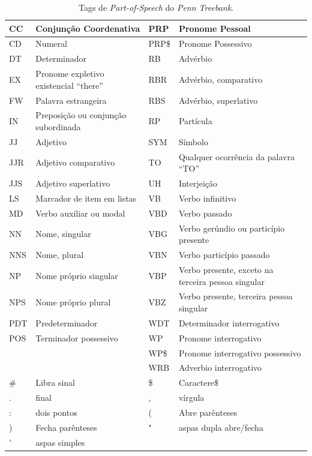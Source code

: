 \begin{table}[H]
   \centering
   \small
   \caption{ Tags de \emph{Part-of-Speech} do \emph{Penn Treebank}.}

   \begin{tabular}{| p{2cm} | p{4cm} | p{2cm} | p{4cm} |}

   \hline

		CC & Conjunção Coordenativa 	& 	PRP & Pronome Pessoal\\
    \hline
		CD & Numeral &   	PRP\$ & Pronome Possessivo\\
      \hline
		DT & Determinador     &		RB & Advérbio\\
      \hline
		EX & Pronome expletivo existencial ``there''     &		RBR & Advérbio, comparativo\\
      \hline
		FW & Palavra estrangeira     &		RBS & Advérbio, superlativo\\
      \hline
		IN & Preposição ou conjunção subordinada      &		RP & Partícula\\
      \hline
		JJ & Adjetivo      &		SYM & Símbolo\\
      \hline
		JJR & Adjetivo comparativo      &		TO & Qualquer ocorrência da palavra ``TO''\\
      \hline
		JJS & Adjetivo superlativo      &		UH & Interjeição\\
      \hline
		LS & Marcador de item em listas      &		VB & Verbo infinitivo\\
      \hline
		MD & Verbo auxiliar ou modal      &		VBD & Verbo passado\\
      \hline
		NN & Nome, singular      &		VBG & Verbo gerúndio ou particípio presente\\
      \hline
		NNS & Nome, plural      &		VBN & Verbo particípio passado\\
      \hline
		NP & Nome próprio singular      &		VBP & Verbo presente, exceto na terceira pessoa singular\\
      \hline
		NPS & Nome próprio plural      &		VBZ & Verbo presente, terceira pessoa singular\\
      \hline
		PDT & Predeterminador      &		WDT & Determinador interrogativo\\
      \hline
		POS & Terminador possessivo      &		WP & Pronome interrogativo\\
    \hline
     & & 	WP\$ & Pronome interrogativo possessivo\\
    \hline
     & & 	WRB & Adverbio interrogativo  \\
    \hline
     \# & Libra sinal & \$ & Caractere\$ \\
    \hline
     . & final & , & vírgula \\
    \hline
     : & dois pontos & ( & Abre parênteses \\
    \hline
     ) & Fecha parênteses & " & aspas dupla abre/fecha \\
     \hline
     ' & aspas simples & &  \\
    \hline

   \end{tabular}
   \label{tbl:penn_treebank_pos}
\end{table}


